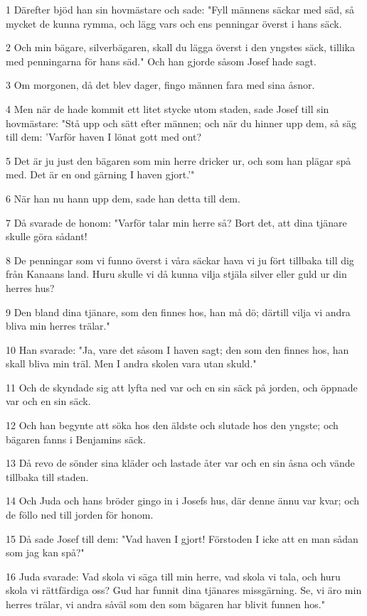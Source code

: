 \par 1 Därefter bjöd han sin hovmästare och sade: "Fyll männens säckar med säd, så mycket de kunna rymma, och lägg vars och ens penningar överst i hans säck.
\par 2 Och min bägare, silverbägaren, skall du lägga överst i den yngstes säck, tillika med penningarna för hans säd." Och han gjorde såsom Josef hade sagt.
\par 3 Om morgonen, då det blev dager, fingo männen fara med sina åsnor.
\par 4 Men när de hade kommit ett litet stycke utom staden, sade Josef till sin hovmästare: "Stå upp och sätt efter männen; och när du hinner upp dem, så säg till dem: 'Varför haven I lönat gott med ont?
\par 5 Det är ju just den bägaren som min herre dricker ur, och som han plägar spå med. Det är en ond gärning I haven gjort.'"
\par 6 När han nu hann upp dem, sade han detta till dem.
\par 7 Då svarade de honom: "Varför talar min herre så? Bort det, att dina tjänare skulle göra sådant!
\par 8 De penningar som vi funno överst i våra säckar hava vi ju fört tillbaka till dig från Kanaans land. Huru skulle vi då kunna vilja stjäla silver eller guld ur din herres hus?
\par 9 Den bland dina tjänare, som den finnes hos, han må dö; därtill vilja vi andra bliva min herres trälar."
\par 10 Han svarade: "Ja, vare det såsom I haven sagt; den som den finnes hos, han skall bliva min träl. Men I andra skolen vara utan skuld."
\par 11 Och de skyndade sig att lyfta ned var och en sin säck på jorden, och öppnade var och en sin säck.
\par 12 Och han begynte att söka hos den äldste och slutade hos den yngste; och bägaren fanns i Benjamins säck.
\par 13 Då revo de sönder sina kläder och lastade åter var och en sin åsna och vände tillbaka till staden.
\par 14 Och Juda och hans bröder gingo in i Josefs hus, där denne ännu var kvar; och de föllo ned till jorden för honom.
\par 15 Då sade Josef till dem: "Vad haven I gjort! Förstoden I icke att en man sådan som jag kan spå?"
\par 16 Juda svarade: Vad skola vi säga till min herre, vad skola vi tala, och huru skola vi rättfärdiga oss? Gud har funnit dina tjänares missgärning. Se, vi äro min herres trälar, vi andra såväl som den som bägaren har blivit funnen hos."
